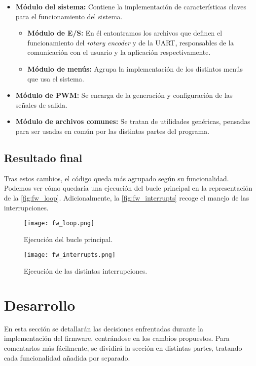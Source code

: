 \begin{itemize}
    \item\textbf{Módulo del sistema:} Contiene la implementación de características claves para el funcionamiento del sistema.
        \begin{itemize}
            \item\textbf{Módulo de E/S:} En él entontramos los archivos que definen el funcionamiento del \textit{rotary encoder} y de la UART, responsables de la comunicación con el usuario y la aplicación respectivamente.
            \item\textbf{Módulo de menús:} Agrupa la implementación de los distintos menús que usa el sistema.
        \end{itemize}
    \item\textbf{Módulo de PWM:} Se encarga de la generación y configuración de las señales de salida.
    \item\textbf{Módulo de archivos comunes:} Se tratan de utilidades genéricas, pensadas para ser usadas en común por las distintas partes del programa.
\end{itemize}

\subsection{Resultado final}

Tras estos cambios, el código queda más agrupado según su funcionalidad. Podemos ver cómo quedaría una ejecución del bucle principal en la representación de la \autoref{fig:fw_loop}. Adicionalmente, la \autoref{fig:fw_interrupts} recoge el manejo de las interrupciones.

\begin{figure}
    \centering
    \texttt{[image: fw\_loop.png]}
    \caption{Ejecución del bucle principal.}
    \label{fig:fw_loop}
\end{figure}

\begin{figure}
    \centering
    \texttt{[image: fw\_interrupts.png]}
    \caption{Ejecución de las distintas interrupciones.}
    \label{fig:fw_interrupts}
\end{figure}

\section{Desarrollo}

En esta sección se detallarán las decisiones enfrentadas durante la implementación del firmware, centrándose en los cambios propuestos. Para comentarlos más fácilmente, se dividirá la sección en distintas partes, tratando cada funcionalidad añadida por separado.

